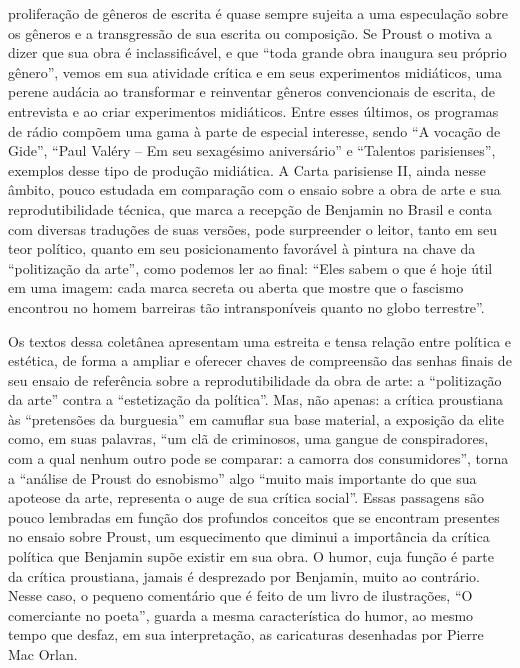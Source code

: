 proliferação de gêneros de escrita é quase sempre sujeita a uma
especulação sobre os gêneros e a transgressão de sua escrita ou
composição. Se Proust o motiva a dizer que sua obra é inclassificável, e
que ``toda grande obra inaugura seu próprio gênero'', vemos em sua
atividade crítica e em seus experimentos midiáticos, uma perene audácia
ao transformar e reinventar gêneros convencionais de escrita, de
entrevista e ao criar experimentos midiáticos. Entre esses últimos, os
programas de rádio compõem uma gama à parte de especial interesse, sendo
``A vocação de Gide'', ``Paul Valéry -- Em seu sexagésimo aniversário''
e ``Talentos parisienses'', exemplos desse tipo de produção midiática. A
Carta parisiense II, ainda nesse âmbito, pouco estudada em comparação
com o ensaio sobre a obra de arte e sua reprodutibilidade técnica, que
marca a recepção de Benjamin no Brasil e conta com diversas traduções de
suas versões, pode surpreender o leitor, tanto em seu teor político,
quanto em seu posicionamento favorável à pintura na chave da
``politização da arte'', como podemos ler ao final: ``Eles sabem o que é
hoje útil em uma imagem: cada marca secreta ou aberta que mostre que o
fascismo encontrou no homem barreiras tão intransponíveis quanto no
globo terrestre''.

Os textos dessa coletânea apresentam uma estreita e tensa relação entre
política e estética, de forma a ampliar e oferecer chaves de compreensão
das senhas finais de seu ensaio de referência sobre a reprodutibilidade
da obra de arte: a ``politização da arte'' contra a ``estetização da
política''. Mas, não apenas: a crítica proustiana às ``pretensões da
burguesia'' em camuflar sua base material, a exposição da elite como, em
suas palavras, ``um clã de criminosos, uma gangue de conspiradores, com
a qual nenhum outro pode se comparar: a camorra dos consumidores'',
torna a ``análise de Proust do esnobismo'' algo ``muito mais importante
do que sua apoteose da arte, representa o auge de sua crítica social''.
Essas passagens são pouco lembradas em função dos profundos conceitos
que se encontram presentes no ensaio sobre Proust, um esquecimento que
diminui a importância da crítica política que Benjamin supõe existir em
sua obra. O humor, cuja função é parte da crítica proustiana, jamais é
desprezado por Benjamin, muito ao contrário. Nesse caso, o pequeno
comentário que é feito de um livro de ilustrações, ``O comerciante no
poeta'', guarda a mesma característica do humor, ao mesmo tempo que
desfaz, em sua interpretação, as caricaturas desenhadas por Pierre Mac
Orlan.

